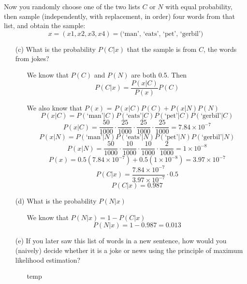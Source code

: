 \documentclass[hidelinks]{article}
\begin{document}
Now you randomly choose one of the two lists $C$ or $N$ with equal probability, then sample
(independently, with replacement, in order) four words from that list, and obtain the sample:
\[
    x = (x1, x2, x3, x4) = \text{(‘man’, ‘eats’, ‘pet’, ‘gerbil’)}
\]
\begin{itemize}
    \item[(c)] What is the probability $P(C|x)$ that the sample is from $C$, the words from jokes?
    \begin{itemize}
        \item[ ] We know that $P(C)$ and $P(N)$ are both 0.5. Then 
        \[
            P(C|x) = \frac{P(x|C)}{P(x)}P(C)
        \]
        \item[ ] We also know that $P(x)$ = $P(x|C)P(C) + P(x|N)P(N)$
        \[
            P(x|C) = P(\text{‘man’}|C)P(\text{‘eats’}|C)P(\text{‘pet’}|C)P(\text{‘gerbil’}|C) 
        \]
        \[
            P(x|C) = \frac{50}{1000}\cdot \frac{25}{1000}\cdot \frac{25}{1000}\cdot \frac{25}{1000} = 7.84\times 10^{-7}
        \]
        \[
            P(x|N) = P(\text{‘man’}|N)P(\text{‘eats’}|N)P(\text{‘pet’}|N)P(\text{‘gerbil’}|N) 
        \]
        \[
            P(x|N) = \frac{50}{1000}\cdot \frac{10}{1000}\cdot \frac{10}{1000}\cdot \frac{2}{1000} = 1\times 10^{-8}
        \]
        \[
            P(x) = 0.5(7.84\times 10^{-7}) + 0.5(1\times 10^{-8}) = 3.97 \times 10^{-7} 
        \]
        \[
            P(C|x) = \frac{7.84\times 10^{-7}}{3.97 \times 10^{-7}} \cdot 0.5 
        \]
        \[
            P(C|x) = 0.987
        \]
    \end{itemize}
    \item[(d)] What is the probability $P(N|x)$
    \begin{itemize}
        \item[ ] We know that $P(N|x) = 1 - P(C|x)$
        \[
            P(N|x) = 1 - 0.987 = 0.013
        \]
    \end{itemize}
    \item[(e)] If you later saw this list of words in a new sentence, how would you (naively) decide whether it is a joke or news using the principle of maximum likelihood estimation?
    \begin{itemize}
        \item[ ] temp
    \end{itemize}

\end{itemize}
\end{document}
